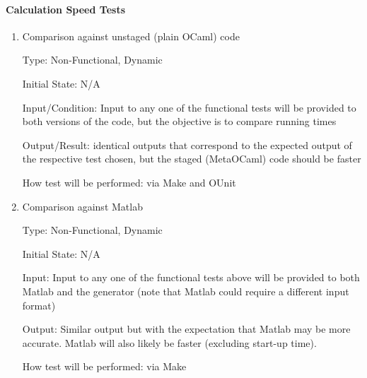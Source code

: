 \documentclass[12pt, titlepage]{article}
\begin{document}
\paragraph{Calculation Speed Tests}

\begin{enumerate}

\item{Comparison against unstaged (plain OCaml) code\\}

Type: Non-Functional, Dynamic
					
Initial State: N/A
					
Input/Condition: Input to any one of the functional tests will be provided to 
both versions 
of the code, but the objective is to compare running times
					
Output/Result: identical outputs that correspond to the expected output of the 
respective test chosen, but the staged (MetaOCaml) code should be 
faster
					
How test will be performed: via Make and OUnit
					
\item{Comparison against Matlab\\}

Type: Non-Functional, Dynamic
					
Initial State: N/A
					
Input: Input to any one of the functional tests above will be provided to both 
Matlab and the generator (note that Matlab could require a different input 
format)
					
Output: Similar output but with the expectation that Matlab may be more 
accurate. Matlab will also likely be faster (excluding start-up time).
					
How test will be performed: via Make



%
%
%
%
%

\end{enumerate}
\end{document}
